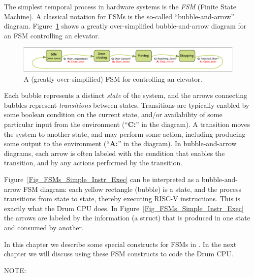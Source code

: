The simplest temporal process in hardware systems is the \emph{FSM}
(Finite State Machine).  A classical notation for FSMs is the
so-called ``bubble-and-arrow'' diagram.
Figure~\ref{Fig_FSM_Bubble_and_Arrow} shows a greatly over-simplified
bubble-and-arrow diagram for an FSM controlling an elevator.
\begin{figure}[htbp]
  \centerline{\includegraphics[width=6in,angle=0]{Figures/Fig_FSM_Bubble_and_Arrow}}
  \caption{\label{Fig_FSM_Bubble_and_Arrow}
           A (greatly over-simplified) FSM for controlling an elevator.}
\end{figure}
Each bubble represents a distinct \emph{state} of the system, and the
arrows connecting bubbles represent \emph{transitions} between states.
Transitions are typically enabled by some boolean condition on the
current state, and/or availability of some particular input from the
environment (``{\bf C:}'' in the diagram).  A transition moves the
system to another state, and may perform some action, including
producing some output to the environment (``{\bf A:}'' in the
diagram).  In bubble-and-arrow diagrams, each arrow is often labeled
with the condition that enables the transition, and by any actions
performed by the transition.


Figure~\ref{Fig_FSMs_Simple_Instr_Exec} can be interpreted as a
bubble-and-arrow FSM diagram: each yellow rectangle (bubble) is a
state, and the process transitions from state to state, thereby
executing RISC-V instructions.  This is exactly what the Drum CPU
does.  In Figure~\ref{Fig_FSMs_Simple_Instr_Exec} the arrows are
labeled by the information (a struct) that is produced in one state
and consumed by another.

In this chapter we describe some special constructs for FSMs in {\BSV}.
In the next chapter we will discuss using these FSM constructs to code
the Drum CPU.

\vspace{2ex}

NOTE: 

